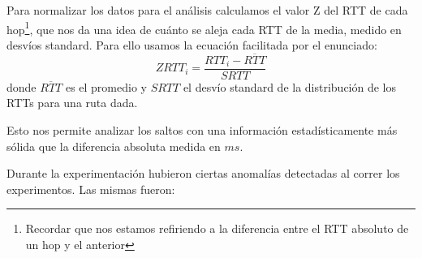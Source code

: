 Para normalizar los datos para el análisis calculamos el valor Z del RTT de cada hop\footnote{Recordar que nos estamos refiriendo a la diferencia entre el RTT absoluto de un hop y el anterior}, que nos da una idea de cuánto se aleja cada RTT de la media, medido en desvíos standard. Para ello usamos la ecuación facilitada por el enunciado: $$ ZRTT_i = \dfrac{RTT_i-\overline{RTT}}{SRTT}$$ donde $\overline{RTT}$ es el promedio y $SRTT$ el desvío standard de la distribución de los RTTs para una ruta dada.

Esto nos permite analizar los saltos con una información estadísticamente más sólida que la diferencia absoluta medida en $ms$.

Durante la experimentación hubieron ciertas anomalías detectadas al correr los experimentos. Las mismas fueron:

